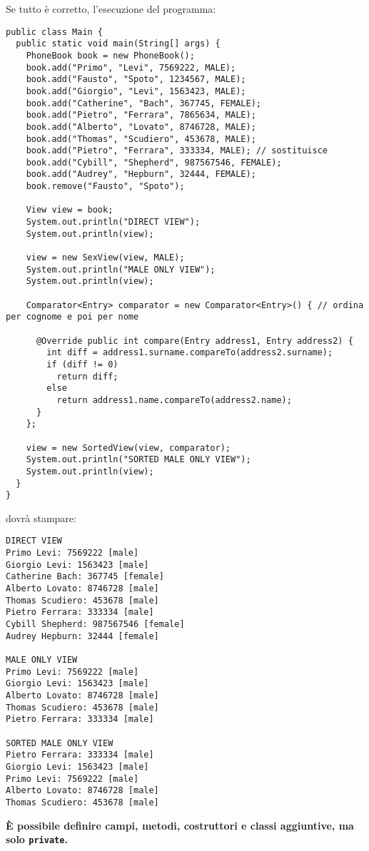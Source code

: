 \documentclass{article}[10pt]
\begin{document}
Se tutto \`e corretto, l'esecuzione del programma:
{\scriptsize\begin{verbatim}
public class Main {
  public static void main(String[] args) {
    PhoneBook book = new PhoneBook();
    book.add("Primo", "Levi", 7569222, MALE);
    book.add("Fausto", "Spoto", 1234567, MALE);
    book.add("Giorgio", "Levi", 1563423, MALE);
    book.add("Catherine", "Bach", 367745, FEMALE);
    book.add("Pietro", "Ferrara", 7865634, MALE);
    book.add("Alberto", "Lovato", 8746728, MALE);
    book.add("Thomas", "Scudiero", 453678, MALE);
    book.add("Pietro", "Ferrara", 333334, MALE); // sostituisce
    book.add("Cybill", "Shepherd", 987567546, FEMALE);
    book.add("Audrey", "Hepburn", 32444, FEMALE);
    book.remove("Fausto", "Spoto");

    View view = book;
    System.out.println("DIRECT VIEW");
    System.out.println(view);

    view = new SexView(view, MALE);
    System.out.println("MALE ONLY VIEW");
    System.out.println(view);

    Comparator<Entry> comparator = new Comparator<Entry>() { // ordina per cognome e poi per nome

      @Override public int compare(Entry address1, Entry address2) {
        int diff = address1.surname.compareTo(address2.surname);
        if (diff != 0)
          return diff;
        else
          return address1.name.compareTo(address2.name);
      }
    };

    view = new SortedView(view, comparator);
    System.out.println("SORTED MALE ONLY VIEW");
    System.out.println(view);
  }
}
\end{verbatim}}

\noindent dovr\`a stampare:

{\scriptsize\begin{verbatim}
DIRECT VIEW
Primo Levi: 7569222 [male]
Giorgio Levi: 1563423 [male]
Catherine Bach: 367745 [female]
Alberto Lovato: 8746728 [male]
Thomas Scudiero: 453678 [male]
Pietro Ferrara: 333334 [male]
Cybill Shepherd: 987567546 [female]
Audrey Hepburn: 32444 [female]

MALE ONLY VIEW
Primo Levi: 7569222 [male]
Giorgio Levi: 1563423 [male]
Alberto Lovato: 8746728 [male]
Thomas Scudiero: 453678 [male]
Pietro Ferrara: 333334 [male]

SORTED MALE ONLY VIEW
Pietro Ferrara: 333334 [male]
Giorgio Levi: 1563423 [male]
Primo Levi: 7569222 [male]
Alberto Lovato: 8746728 [male]
Thomas Scudiero: 453678 [male]            
\end{verbatim}}

\begin{center}
\textbf{\`E possibile definire campi, metodi, costruttori e classi aggiuntive, ma solo \texttt{private}.}
\end{center}
\end{document}
